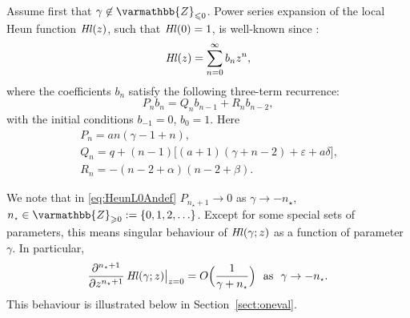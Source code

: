 \documentclass[11pt]{article}
\newcommand{\MF}[1]{\mathop{\mbox{$#1$}}\nolimits}
\newcommand{\Zzp}{\varmathbb{Z}_{\geqslant0}}%
\newcommand{\Zzm}{\varmathbb{Z}_{\leqslant0}}%
\def\HeunL{\MF{\textit{Hl\/}}}%
\def\nst{n_{\scriptscriptstyle\star}}
\begin{document}
Assume first that $\gamma\not\in\Zzm$. Power series expansion of the local Heun function $\HeunL(z)$, such that $\HeunL(0)=1$, is well-known since \cite{Heun}:
\begin{equation}
\HeunL(z)=\sum_{n=0}^{\infty}b_n z^n,
\label{eq:HeunL0series}
\end{equation}
where the coefficients $b_n$ satisfy the following three-term
recurrence:
\begin{equation}
  P_n b_n=Q_n b_{n-1}+R_n b_{n-2},
\label{eq:HeunL0Andef}
\end{equation}
with the initial conditions $b_{-1}=0$, $b_0=1$. Here
\begin{equation}
\!\!\!~\begin{gathered}
P_n = a n (\gamma-1+n),\\ Q_n = q +
(n-1)\bigl[(a+1)(\gamma+n-2)+\varepsilon+a\delta\bigr],\\ R_n =
-(n-2+\alpha)(n-2+\beta).
\end{gathered}\!\!\!\!
\label{eq:PQRdef}
\end{equation}

We note that  in \eqref{eq:HeunL0Andef} $P_{\nst+1}\to0$ as $\gamma\to-\nst$, $\nst\in\Zzp:=\{0,1,2,\ldots\}$. Except for some special sets of parameters, this means singular behaviour of $\HeunL(\gamma;z)$ as a function of parameter $\gamma$. In particular, 
\[
  \frac{\partial^{\nst+1}}{\partial z^{\nst+1}}\HeunL(\gamma;z)\bigr|_{z=0}=\MF{O}\Bigl(\frac{1}{\gamma+\nst}\Bigr)\ \ \mbox{as}\ \ \gamma\to-\nst.
\]
This behaviour is illustrated below in Section~\ref{sect:oneval}.
\end{document}
